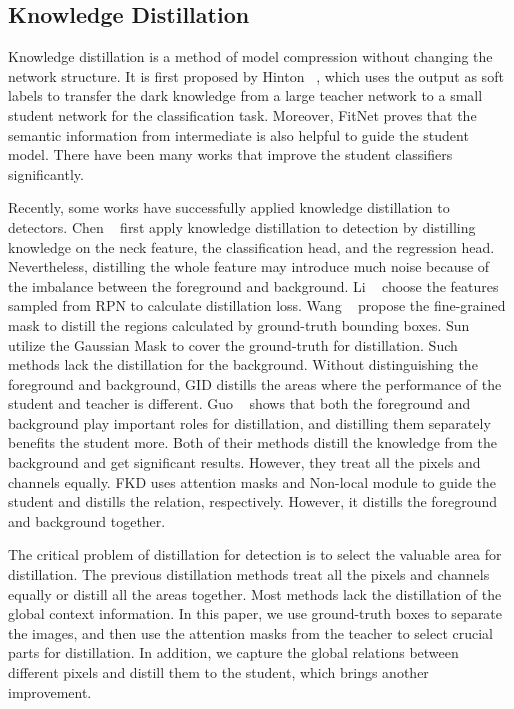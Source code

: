 \documentclass[10pt,twocolumn,letterpaper]{article}
\begin{document}
\subsection{Knowledge Distillation}
Knowledge distillation is a method of model compression without changing the network structure. It is first proposed by Hinton \etal~\cite{hinton2015distilling}, which uses the output as soft labels to transfer the dark knowledge from a large teacher network to a small student network for the classification task. Moreover, FitNet\cite{romero2014fitnets} proves that the semantic information from intermediate is also helpful to guide the student model. There have been many works\cite{zagoruyko2016paying, yim2017gift, heo2019comprehensive, tung2019similarity} that improve the student classifiers significantly.

Recently, some works have successfully applied knowledge distillation to detectors. Chen \etal~\cite{chen2017learning} first apply knowledge distillation to detection by distilling knowledge on the neck feature, the classification head, and the regression head. Nevertheless, distilling the whole feature may introduce much noise because of the imbalance between the foreground and background. Li \etal~\cite{li2017mimicking} choose the features sampled from RPN to calculate distillation loss. Wang \etal~\cite{wang2019distilling} propose the fine-grained mask to distill the regions calculated by ground-truth bounding boxes. Sun \etal~\cite{sun2020distilling} utilize the Gaussian Mask to cover the ground-truth for distillation. Such methods lack the distillation for the background. Without distinguishing the foreground and background, GID\cite{dai2021general} distills the areas where the performance of the student and teacher is different. Guo \etal~\cite{guo2021distilling} shows that both the foreground and background play important roles for distillation, and distilling them separately benefits the student more. Both of their methods distill the knowledge from the background and get significant results. However, they treat all the pixels and channels equally. FKD\cite{zhang2020improve} uses attention masks and Non-local module\cite{wang2018non} to guide the student and distills the relation, respectively. However, it distills the foreground and background together.

The critical problem of distillation for detection is to select the valuable area for distillation. The previous distillation methods treat all the pixels and channels equally\cite{wang2019distilling,sun2020distilling,dai2021general,guo2021distilling} or distill all the areas\cite{zhang2020improve} together. Most methods lack the distillation of the global context information. In this paper, we use ground-truth boxes to separate the images, and then use the attention masks from the teacher to select crucial parts for distillation. In addition, we capture the global relations between different pixels and distill them to the student, which brings another improvement.
\end{document}
